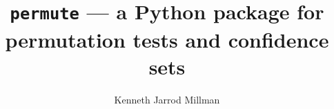 \documentclass[masters]{ucbthesis}
\begin{document}
\renewcommand\thmcontinues[1]{Continued}

\title{\texttt{permute} --- a Python package for permutation tests and confidence sets}
\author{Kenneth Jarrod Millman}


\maketitle
\approvalpage
\copyrightpage

%

\begin{frontmatter}



\tableofcontents
\clearpage



\end{frontmatter}

\pagestyle{headings}







%

\printbibliography
\end{document}
